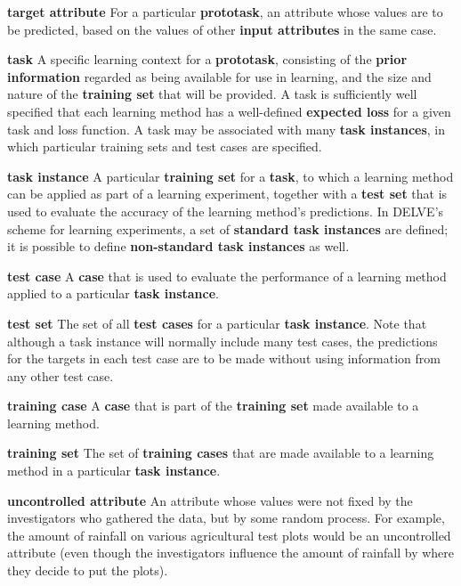 \begin{list}{}{%
\setlength{\itemsep}{0in}%
\setlength{\leftmargin}{2.25in}%
\setlength{\labelsep}{0in}%
\setlength{\labelwidth}{2.25in}}
\item[\bf target attribute \hfill]
For a particular {\bf prototask}, an attribute whose values are to 
be predicted, based on the values of other {\bf input attributes} 
in the same case. 

\item[\bf task \hfill]
A specific learning context for a {\bf prototask}, consisting of the 
{\bf prior information} regarded as being 
available for use in learning, and the size and nature of the {\bf training set}
that will be provided.  A task is sufficiently
well specified that each learning method has a well-defined {\bf expected
loss} for a given task and loss function.  A task may be associated with
many {\bf task instances}, in which particular training sets and 
test cases are specified.

\item[\bf task instance \hfill]
A particular {\bf training set} for a {\bf task}, to which a learning method
can be applied as part of a learning experiment, together with a {\bf test
set} that is used to evaluate the accuracy of the learning method's
predictions. In DELVE's scheme for learning experiments, a set of {\bf standard
task instances} are defined; it is possible to define {\bf non-standard task
instances} as well.

\item[\bf test case \hfill]
A {\bf case} that is used to evaluate the performance of a 
learning method applied to a particular {\bf task instance}.

\item[\bf test set \hfill]
The set of all {\bf test cases} for a particular {\bf task instance}.
Note that although a task instance will normally include many test
cases, the predictions for the targets in each test case are to be made 
without using information from any other test case.

\item[\bf training case \hfill]
A {\bf case} that is part of the {\bf training set} made available
to a learning method.

\item[\bf training set \hfill]
The set of {\bf training cases} that are made available to a 
learning method in a particular {\bf task instance}.

\item[\bf uncontrolled attribute \hfill]
An attribute whose values were not fixed by the investigators who gathered
the data, but by some random process.  For example, the amount of rainfall
on various agricultural test plots would be an uncontrolled attribute 
(even though the investigators influence the amount of rainfall by where
they decide to put the plots).


\end{list}
